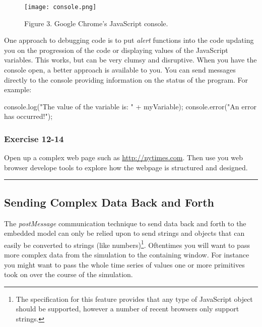 \documentclass[]{memoir}
\makeatletter
\newenvironment{Shaded}{}{}
\newcommand{\StringTok}[1]{\textcolor[rgb]{0.25,0.44,0.63}{{#1}}}
\newcommand{\OtherTok}[1]{\textcolor[rgb]{0.00,0.44,0.13}{{#1}}}
\newcommand{\FunctionTok}[1]{\textcolor[rgb]{0.02,0.16,0.49}{{#1}}}
\newcommand{\NormalTok}[1]{{#1}}
\def\maxwidth{\ifdim\Gin@nat@width>\linewidth\linewidth
\else\Gin@nat@width\fi}
\let\Oldincludegraphics\includegraphics
\renewcommand{\includegraphics}[1]{\Oldincludegraphics[width=\maxwidth]{#1}}
\makeatother
\begin{document}
\begin{figure}[htbp]
\centering
\texttt{[image: console.png]}
\caption{Figure 3. Google Chrome's JavaScript console.}
\end{figure}

One approach to debugging code is to put \emph{alert} functions into the
code updating you on the progression of the code or displaying values of
the JavaScript variables. This works, but can be very clumsy and
disruptive. When you have the console open, a better approach is
available to you. You can send messages directly to the console
providing information on the status of the program. For example:

\begin{Shaded}
\begin{Highlighting}[]
\OtherTok{console}\NormalTok{.}\FunctionTok{log}\NormalTok{(}\StringTok{"The value of the variable is: "} \NormalTok{+ myVariable);}
\OtherTok{console}\NormalTok{.}\FunctionTok{error}\NormalTok{(}\StringTok{"An error has occurred!"}\NormalTok{);}
\end{Highlighting}
\end{Shaded}

\subsubsection{Exercise 12-14}

Open up a complex web page such as \url{http://nytimes.com}. Then use
you web browser develope tools to explore how the webpage is structured
and designed.

\begin{center}\rule{3in}{0.4pt}\end{center}

\subsection{Sending Complex Data Back and Forth}

The \emph{postMessage} communication technique to send data back and
forth to the embedded model can only be relied upon to send strings and
objects that can easily be converted to strings (like numbers)\footnote{The
  specification for this feature provides that any type of JavaScript
  object should be supported, however a number of recent browsers only
  support strings.}. Oftentimes you will want to pass more complex data
from the simulation to the containing window. For instance you might
want to pass the whole time series of values one or more primitives took
on over the course of the simulation.
\end{document}
